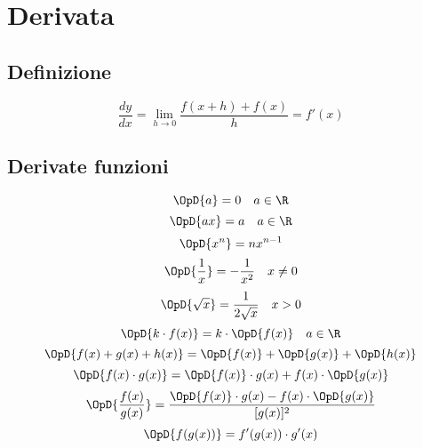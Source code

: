 \chapter{Derivata}
\section{Definizione}
\begin{equation*}
\dfrac{dy}{dx}=\lim_{h \to 0}\dfrac{f(x+h)+f(x)}{h}=f'(x)
\end{equation*}
\section{Derivate funzioni}
\begin{equation*}
\OpD{a}=0\quad a\in\R
\end{equation*}
\begin{equation*}
\OpD{ax}=a\quad a\in\R
\end{equation*}
\begin{equation*}
\OpD{x^n}=nx^{n-1}
\end{equation*}
\begin{equation*}
\OpD{\dfrac{1}{x}}=-\dfrac{1}{x^2}\quad x\neq 0
\end{equation*}
\begin{equation*}
\OpD{\sqrt{x}}=\dfrac{1}{2\sqrt{x}}\quad x> 0
\end{equation*}
\begin{equation*}
\OpD{k\cdot f( x )}=k\cdot\OpD{f(x)}\quad a\in\R
\end{equation*}
\begin{equation*}
\OpD{f( x )+g( x )+h( x )}=\OpD{f( x )}+\OpD{g( x )}+\OpD{h( x )}
\end{equation*}
\begin{equation*}
\OpD{f( x )\cdot g( x )}=\OpD{f( x )}\cdot g( x )+f( x )\cdot\OpD{g( x )}
\end{equation*}
\begin{equation*}
\OpD{\dfrac{f( x )}{g( x )}}=\dfrac{\OpD{f( x )}\cdot g( x )-f( x )\cdot\OpD{g( x )}} {[g( x )]^2}
\end{equation*}
\begin{equation*}
\OpD{f(g(x))}=f'(g(x))\cdot g'(x)
\end{equation*}
